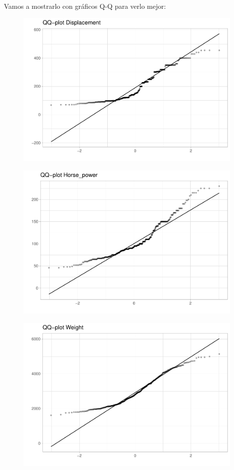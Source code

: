 Vamos a mostrarlo con gráficos Q-Q para verlo mejor:

\begin{figure}[H]\includegraphics[width=.9\linewidth]{img/EDA_files/figure-latex/unnamed-chunk-14-1} \caption{}\end{figure}

\begin{figure}[H]\includegraphics[width=.9\linewidth]{img/EDA_files/figure-latex/unnamed-chunk-14-2} \caption{}\end{figure}

\begin{figure}[H]\includegraphics[width=.9\linewidth]{img/EDA_files/figure-latex/unnamed-chunk-14-3} \caption{}\end{figure}

